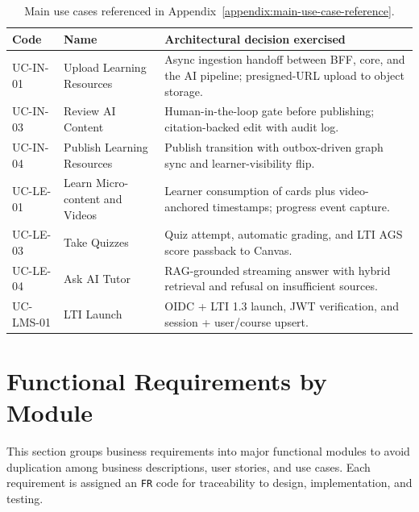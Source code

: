 \begin{table}[H]
    \centering
    \caption{Main use cases referenced in
    Appendix~\ref{appendix:main-use-case-reference}.}
    \label{tab:main-uc-summary}
    \begin{tabular}{|p{2.4cm}|p{4.4cm}|p{7.5cm}|}
        \hline
        \textbf{Code} & \textbf{Name} & \textbf{Architectural decision exercised} \\
        \hline
        UC-IN-01 & Upload Learning Resources
            & Async ingestion handoff between BFF, core, and the AI
              pipeline; presigned-URL upload to object storage. \\
        \hline
        UC-IN-03 & Review AI Content
            & Human-in-the-loop gate before publishing; citation-backed
              edit with audit log. \\
        \hline
        UC-IN-04 & Publish Learning Resources
            & Publish transition with outbox-driven graph sync and
              learner-visibility flip. \\
        \hline
        UC-LE-01 & Learn Micro-content and Videos
            & Learner consumption of cards plus video-anchored timestamps;
              progress event capture. \\
        \hline
        UC-LE-03 & Take Quizzes
            & Quiz attempt, automatic grading, and LTI AGS score passback
              to Canvas. \\
        \hline
        UC-LE-04 & Ask AI Tutor
            & RAG-grounded streaming answer with hybrid retrieval and
              refusal on insufficient sources. \\
        \hline
        UC-LMS-01 & LTI Launch
            & OIDC + LTI 1.3 launch, JWT verification, and session +
              user/course upsert. \\
        \hline
    \end{tabular}
\end{table}


\section{Functional Requirements by Module}
\label{sec:yeu-cau-chuc-nang-theo-module}

This section groups business requirements into major functional modules to
avoid duplication among business descriptions, user stories, and use cases.
Each requirement is assigned an \texttt{FR} code for traceability to design,
implementation, and testing.

